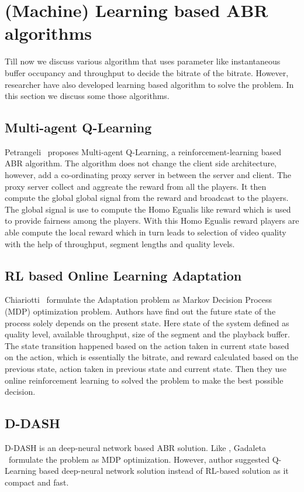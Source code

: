 \section{(Machine) Learning based ABR algorithms}
Till now we discuss various algorithm that uses parameter like instantaneous buffer occupancy and throughput to decide the bitrate of the bitrate. However, researcher have also developed learning based algorithm to solve the problem. In this section we discuss some those algorithms.

\subsection{Multi-agent Q-Learning}
Petrangeli \etal\ proposes Multi-agent Q-Learning\cite{6838245}, a reinforcement-learning based ABR algorithm. The algorithm does not change the client side architecture, however, add a co-ordinating proxy server in between the server and client. The proxy server collect and aggreate the reward from all the players. It then compute the global global signal from the reward and broadcast to the players. The global signal is use to compute the Homo Egualis \cite{10.5555/1402298.1402344} like reward which is used to provide fairness among the players. With this Homo Egualis reward players are able compute the local reward which in turn leads to selection of video quality with the help of throughput, segment lengths and quality levels.

\subsection{RL based Online Learning Adaptation}
Chiariotti \etal\ formulate the Adaptation problem as Markov Decision Process (MDP)\cite{P-1066} optimization problem\cite{10.1145/2910017.2910603}. Authors have find out the future state of the process solely depends on the present state. Here state of the system defined as quality level, available throughput, size of the segment and the playback buffer. The state transition happened based on the action taken in current state based on the action, which is essentially the bitrate, and reward calculated based on the previous state, action taken in previous state and current state. Then they use online reinforcement learning to solved the problem to make the best possible decision.

\subsection{D-DASH \cite{8048013}}
D-DASH\cite{8048013} is an deep-neural network based ABR solution. Like \cite{10.1145/2910017.2910603}, Gadaleta \etal\ formulate the problem as MDP optimization. However, author suggested Q-Learning based deep-neural network solution instead of RL-based solution as it compact and fast.

